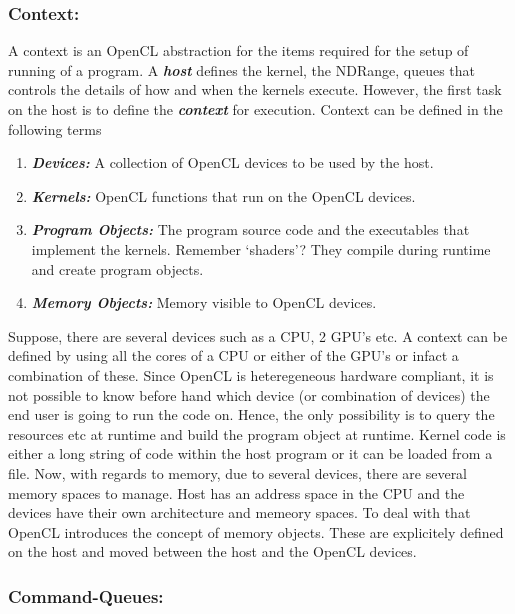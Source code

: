 \documentclass[10pt]{article}
\begin{document}
\subsubsection{Context:}
A context is an OpenCL abstraction for the items required for the setup of running of a program. A \textit{\textbf{host}} defines the kernel, the NDRange, queues that controls the details of how and when the kernels execute. However, the first task on the host is to define the \textit{\textbf{context}} for execution. Context can be defined in the following terms
\begin{enumerate}
	\item \textit{\textbf{Devices:}} A collection of OpenCL devices to be used by the host.
	\item \textit{\textbf{Kernels:}} OpenCL functions that run on the OpenCL devices.
	\item \textit{\textbf{Program Objects:}} The program source code and the executables that implement the kernels. Remember `shaders'? They compile during runtime and create program objects.
	\item \textit{\textbf{Memory Objects:}} Memory visible to OpenCL devices.
\end{enumerate}

Suppose, there are several devices such as a CPU, 2 GPU's etc. A context can be defined by using all the cores of a CPU or either of the GPU's or infact a combination of these. Since OpenCL is heteregeneous hardware compliant, it is not possible to know before hand which device (or combination of devices) the end user is going to run the code on. Hence, the only possibility is to query the resources etc at runtime and build the program object at runtime. Kernel code is either a long string of code within the host program or it can be loaded from a file. Now, with regards to memory, due to several devices, there are several memory spaces to manage. Host has an address space in the CPU and the devices have their own architecture and memeory spaces. To deal with that OpenCL introduces the concept of memory objects. These are explicitely defined on the host and moved between the host and the OpenCL devices.

\subsubsection{Command-Queues:}
\end{document}

